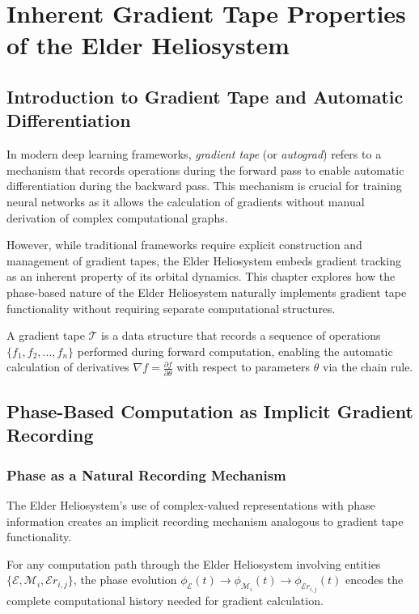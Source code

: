 \chapter{Inherent Gradient Tape Properties of the Elder Heliosystem}

\section{Introduction to Gradient Tape and Automatic Differentiation}

In modern deep learning frameworks, \textit{gradient tape} (or \textit{autograd}) refers to a mechanism that records operations during the forward pass to enable automatic differentiation during the backward pass. This mechanism is crucial for training neural networks as it allows the calculation of gradients without manual derivation of complex computational graphs.

However, while traditional frameworks require explicit construction and management of gradient tapes, the Elder Heliosystem embeds gradient tracking as an inherent property of its orbital dynamics. This chapter explores how the phase-based nature of the Elder Heliosystem naturally implements gradient tape functionality without requiring separate computational structures.

\begin{definition}
A gradient tape $\mathcal{T}$ is a data structure that records a sequence of operations $\{f_1, f_2, \ldots, f_n\}$ performed during forward computation, enabling the automatic calculation of derivatives $\nabla f = \frac{\partial f}{\partial \theta}$ with respect to parameters $\theta$ via the chain rule.
\end{definition}

\section{Phase-Based Computation as Implicit Gradient Recording}

\subsection{Phase as a Natural Recording Mechanism}

The Elder Heliosystem's use of complex-valued representations with phase information creates an implicit recording mechanism analogous to gradient tape functionality.

\begin{theorem}
For any computation path through the Elder Heliosystem involving entities $\{\mathcal{E}, \mathcal{M}_i, \mathcal{E}r_{i,j}\}$, the phase evolution $\phi_{\mathcal{E}}(t) \rightarrow \phi_{\mathcal{M}_i}(t) \rightarrow \phi_{\mathcal{E}r_{i,j}}(t)$ encodes the complete computational history needed for gradient calculation.
\end{theorem}

